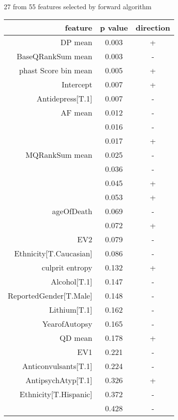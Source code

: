\documentclass[usenames,dvipsnames]{beamer}
\begin{document}
\begin{frame}{27 from 55 features selected by forward algorithm}
\tiny

\begin{tabular}{rcc}
feature & p value & direction \\
\hline
DP mean & 0.003 & + \\
BaseQRankSum mean & 0.003 & - \\
phast Score bin mean & 0.005 & + \\
Intercept & 0.007 & + \\
Antidepress[T.1] & 0.007 & - \\
AF mean & 0.012 & - \\
\color{NavyBlue}{gerp ElementRSScore bin mean} & 0.016 & - \\
\color{NavyBlue}{ensembl PredictedFunction entropy} & 0.017 & + \\
MQRankSum mean & 0.025 & - \\
\color{NavyBlue}{GWASpval mean} & 0.036 & - \\
\color{NavyBlue}{szdbCNVcount mean} & 0.045 & + \\
\color{NavyBlue}{cpg CpGIsland bin mean} & 0.053 & + \\
ageOfDeath & 0.069 & - \\
\color{NavyBlue}{encode FeatureTypeClass entropy} & 0.072 & + \\
EV2 & 0.079 & - \\
Ethnicity[T.Caucasian] & 0.086 & - \\
culprit entropy & 0.132 & + \\
Alcohol[T.1] & 0.147 & - \\
ReportedGender[T.Male] & 0.148 & - \\
Lithium[T.1] & 0.162 & - \\
YearofAutopsy & 0.165 & - \\
QD mean & 0.178 & + \\
EV1 & 0.221 & - \\
Anticonvulsants[T.1] & 0.224 & - \\
AntipsychAtyp[T.1] & 0.326 & + \\
Ethnicity[T.Hispanic] & 0.372 & - \\
\color{NavyBlue}{sift Prediction entropy} & 0.428 & - \\
\end{tabular}
\end{frame}
\end{document}
